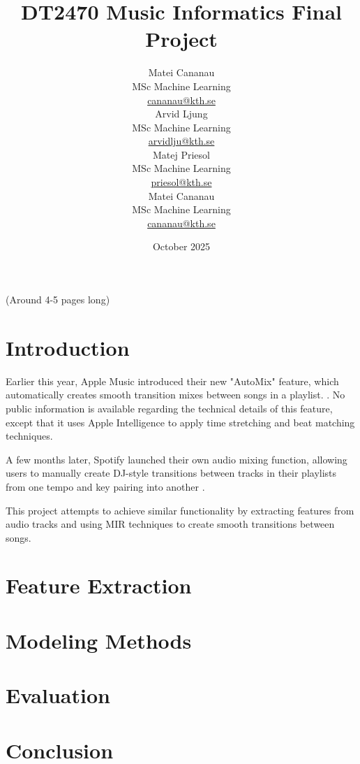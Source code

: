 \documentclass{article}
\title{DT2470 Music Informatics Final Project}
\date{October 2025}
\author{
    \begin{minipage}[t]{0.24\textwidth}
        \centering
        Matei Cananau \\
        MSc Machine Learning \\
        \href{mailto:cananau@kth.se}{cananau@kth.se}
    \end{minipage}
    \hfill
    \begin{minipage}[t]{0.24\textwidth}
        \centering
        Arvid Ljung \\
        MSc Machine Learning \\
        \href{mailto:arvidlju@kth.se}{arvidlju@kth.se}
    \end{minipage}
    \hfill
    \begin{minipage}[t]{0.24\textwidth}
        \centering
        Matej Priesol \\
        MSc Machine Learning \\
        \href{mailto:priesol@kth.se}{priesol@kth.se}
    \end{minipage}
    \hfill
    \begin{minipage}[t]{0.24\textwidth}
        \centering
        Matei Cananau \\
        MSc Machine Learning \\
        \href{mailto:cananau@kth.se}{cananau@kth.se}
    \end{minipage}
}
\begin{document}
\maketitle

\tableofcontents

(Around 4-5 pages long)


\newpage

\section{Introduction}

Earlier this year, Apple Music introduced their new "AutoMix" feature, which automatically creates smooth transition mixes between songs in a playlist. \cite{apple2025}. No public information is available regarding the technical details of this feature, except that it uses Apple Intelligence to apply time stretching and beat matching techniques.

A few months later, Spotify launched their own audio mixing function, allowing users to manually create DJ-style transitions between tracks in their playlists from one tempo and key pairing into another \cite{spotify2025}.

This project attempts to achieve similar functionality by extracting features from audio tracks and using MIR techniques to create smooth transitions between songs.

\section{Feature Extraction}

\section{Modeling Methods}
\cite{vandeveire2018automateddj}

\section{Evaluation}

\section{Conclusion}



\end{document}
